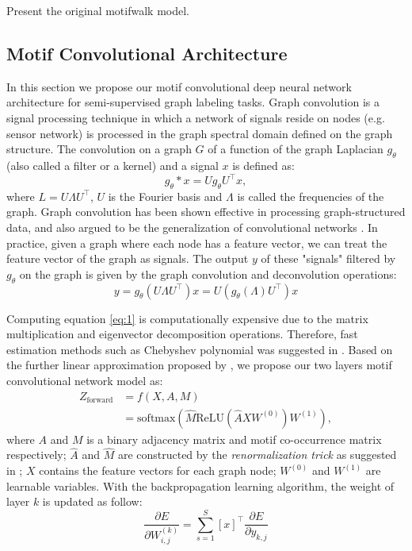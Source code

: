 \documentclass{article}
\theoremstyle{definition}
\begin{document}
Present the original motifwalk model.

\subsection{Motif Convolutional Architecture}

In this section we propose our motif convolutional deep
neural network architecture for semi-supervised graph labeling
tasks. Graph convolution is a signal processing technique in which
a network of signals reside on nodes (e.g. sensor network) is
processed in the graph spectral domain defined on the graph structure.
The convolution on a graph $G$ of a function of the graph Laplacian $g_{\theta}$ 
(also called a filter or a kernel) and a signal $x$ is defined as:
$$g_{\theta} \ast x = U g_{\theta} U^{\top} x,$$
where $L = U \Lambda U^\top$, $U$ is the Fourier basis
and $\Lambda$ is called the frequencies of the graph. 
Graph convolution has been shown effective in processing
graph-structured data, and also argued to be the generalization
of convolutional networks \cite{shuman2013emerging,defferrard2016convolutional,gcn}.
In practice, given a graph where each node has a feature vector,
we can treat the feature vector of the graph as signals. The output $y$
of these "signals" filtered by $g_\theta$ on the graph is given by
the graph convolution and deconvolution operations: 
\begin{equation}
\label{eq:1}
y = g_\theta (U \Lambda U^\top) x = U (g_\theta(\Lambda) U^\top)x
\end{equation}

Computing equation \ref{eq:1} is computationally expensive
due to the matrix multiplication and eigenvector decomposition operations.
Therefore, fast estimation methods such as Chebyshev polynomial was suggested
in \cite{hammond2011wavelets}. Based on the further linear approximation
proposed by \citeauthor{gcn}, we propose our two layers motif convolutional network
model as:
\begin{equation} \label{eq:2}
    \begin{aligned}
    Z_{\mbox{forward}} &= f(X,A,M) \\
    &= \mbox{softmax}(\hat{M} \mbox{ReLU}(\hat{A}XW^{(0)})W^{(1)}),
    \end{aligned}
\end{equation}
where $A$ and $M$ is a binary adjacency matrix and motif co-occurrence
matrix respectively; $\hat{A}$ and $\hat{M}$ are constructed by the
\emph{renormalization trick} as suggested in \cite{gcn}; $X$ contains
the feature vectors for each graph node; $W^{(0)}$ and $W^{(1)}$ are
learnable variables. With the backpropagation learning algorithm, the
weight of layer $k$ is updated as follow: 
\begin{equation}
\label{eq:3}
\frac{\partial E}{\partial W^{(k)}_{i,j}} = \sum^S_{s=1} [x]^\top \frac{\partial E}{\partial y_{k,j}}
\end{equation}
\end{document}
